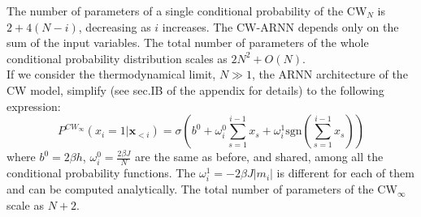 \documentclass[aps,physrev,10pt,floatfix,reprint]{revtex4-2}
\begin{document}
The number of parameters of a single conditional probability of the CW$_N$ is $2+4(N-i)$, decreasing as $i$ increases. %
The CW-ARNN depends only on the sum of the input variables.
The total number of parameters of the whole conditional probability distribution scales as $2N^2+ O(N)$. \\
If we consider the thermodynamical limit, $N \gg 1$, the ARNN architecture of the CW model, simplify (see sec.IB of the appendix for details) to the following expression:
\begin{equation}
    \label{eq:curie_weiss_cond2}
    P^{CW_{\infty}}\left(x_{i}=1|\mathbf{x}_{<i}\right) =  \sigma \left(b^0+\omega_{i}^0\sum_{s=1}^{i-1}x_{s} + \omega_i^1 \text{sgn}(\sum_{s=1}^{i-1}x_{s})\right)
\end{equation}
where $b^0=2\beta h$, $\omega^0_i = \frac{2\beta J}{N}$ are the same as before, and shared, among all the conditional probability functions. The $\omega^1_i = -2\beta J |m_i|$ is different for each of them and can be computed analytically. 
The total number of parameters of the CW$_{\infty}$ scale as $N+2$.
    
\end{document}
